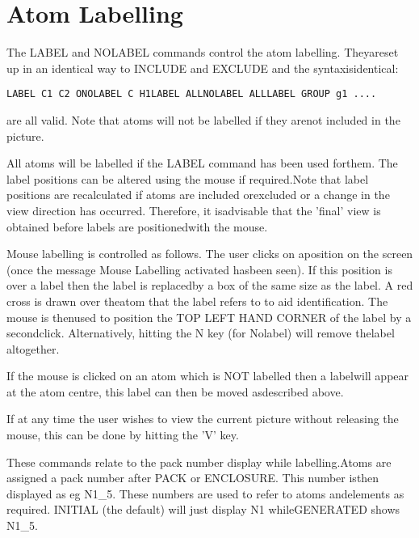 \documentclass[10pt,a4paper]{report}
\begin{document}
\chapter{Atom Labelling}

\bigskip{}



\bigskip{}



The LABEL and NOLABEL commands control the atom labelling. Theyareset up in an identical way to INCLUDE and EXCLUDE and the syntaxisidentical:\small\begin{verbatim}LABEL C1 C2 ONOLABEL C H1LABEL ALLNOLABEL ALLLABEL GROUP g1 ....\end{verbatim}\normalsize

are all valid. Note that atoms will not be labelled if they arenot included in the picture.

\bigskip{}

All atoms will be labelled if the LABEL command has been used forthem. The label positions can be altered using the mouse if required.Note that label positions are recalculated if atoms are included orexcluded or a change in the view direction has occurred. Therefore, it isadvisable that the 'final' view is obtained before labels are positionedwith the mouse.

Mouse labelling is controlled as follows. The user clicks on aposition on the screen (once the message Mouse Labelling activated hasbeen seen). If this position is over a label then the label is replacedby a box of the same size as the label. A red cross is drawn over theatom that the label refers to to aid identification. The mouse is thenused to position the TOP LEFT HAND CORNER of the label by a secondclick. Alternatively, hitting the N key (for Nolabel) will remove thelabel altogether.

If the mouse is clicked on an atom which is NOT labelled then a labelwill appear at the atom centre, this label can then be moved asdescribed above.

If at any time the user wishes to view the current picture without releasing the mouse, this can be done by hitting the 'V' key.

\bigskip{}

\bigskip{}

These commands relate to the pack number display while labelling.Atoms are assigned a pack number after PACK or ENCLOSURE. This number isthen displayed as eg N1\_5. These numbers are used to refer to atoms andelements as required. INITIAL (the default) will just display N1 whileGENERATED shows N1\_5.
\end{document}
